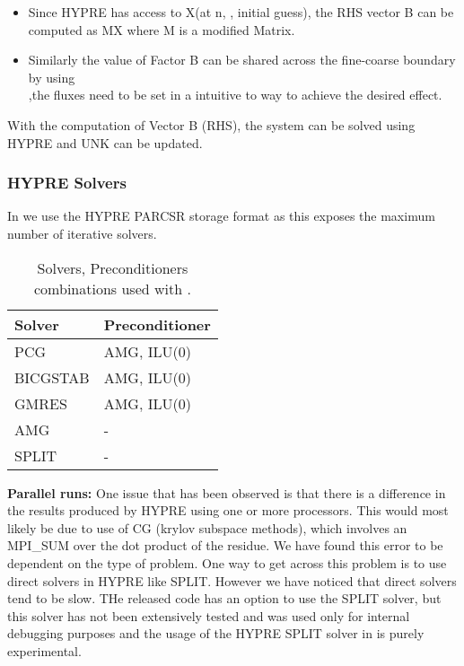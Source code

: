 \begin{itemize}
\item {Since HYPRE has access to X(at n, \ie, initial guess), the RHS vector B can be computed as MX where M is a modified Matrix.}
\item {Similarly the value of Factor B can be shared across the fine-coarse boundary by using \\
,the fluxes need to be set in a intuitive to way to achieve the desired effect.} \\
\end{itemize}

With the computation of Vector B (RHS), the system can be solved using HYPRE and UNK can be updated. \\

\subsubsection{HYPRE Solvers}
\label{Sec:Hypre Solvers}
In \flashx  we use the HYPRE PARCSR storage format as this exposes the maximum number of iterative solvers. 

\begin{center}
\begin{longtable}{ll}
\caption{ \label{Tab:HYPRE solver types} Solvers, Preconditioners combinations used with .} \\
Solver        & Preconditioner  \\
\hline
PCG & AMG, ILU(0) \\
BICGSTAB & AMG, ILU(0) \\
GMRES & AMG, ILU(0) \\
AMG & - \\
SPLIT & - \\
\hline
\end{longtable}
\end{center}

{\bf Parallel runs:} One issue that has been observed is that there is a difference in the results produced by HYPRE using one or 
more processors. This would most likely be due to use of CG (krylov subspace methods), which involves an MPI\_SUM over the 
dot product of the residue. We have found this error to be dependent on the type of problem. One way to get across this problem is to use 
direct solvers in HYPRE like SPLIT. However we have noticed that direct solvers tend to be slow. THe released code has
an option to use the SPLIT solver, but this solver has not been extensively tested and was used only for internal debugging 
purposes and the usage of the HYPRE SPLIT solver in \flashx is purely experimental. \\ 

